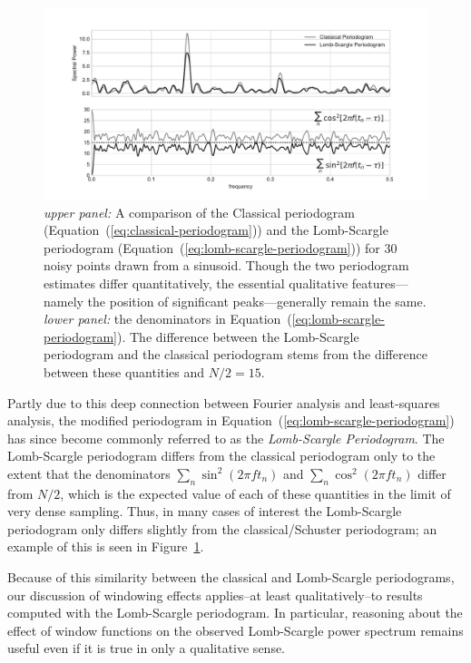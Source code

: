 \documentclass[preprint]{aastex}
\newcommand{\fig}[1]{Figure~\ref{fig:#1}}
\newcommand{\figlabel}[1]{\label{fig:#1}}
\newcommand{\Eq}[1]{Equation~(\ref{eq:#1})}
\newcommand{\eq}[1]{\Eq{#1}}
\begin{document}
\begin{figure}[ht]
  \centering
  \includegraphics[width=\textwidth]{fig17_ls_comparison}
  \caption{{\it upper panel:} A comparison of the Classical periodogram
    (\eq{classical-periodogram}) and the Lomb-Scargle periodogram
    (\eq{lomb-scargle-periodogram}) for 30 noisy points drawn from a sinusoid.
    Though the two periodogram estimates differ quantitatively, the essential
    qualitative features---namely the position of significant peaks---generally
    remain the same.
    {\it lower panel:} the denominators in \eq{lomb-scargle-periodogram}.
    The difference between the Lomb-Scargle periodogram and the classical
    periodogram stems from the difference between these quantities
    and $N/2 = 15$.
    \figlabel{ls-comparison}}
\end{figure}

Partly due to this deep connection between Fourier analysis and least-squares
analysis, the modified periodogram in \eq{lomb-scargle-periodogram}
has since become commonly referred to as the {\it Lomb-Scargle Periodogram}.
The Lomb-Scargle periodogram differs from the classical periodogram only to
the extent that the denominators $\sum_n \sin^2(2\pi f t_n)$ and
$\sum_n \cos^2(2\pi f t_n)$ differ from $N/2$, which is the expected value of
each of these quantities in the limit of very dense sampling.
Thus, in many cases of interest the Lomb-Scargle periodogram only differs
slightly from the classical/Schuster periodogram; an example of this is seen
in \fig{ls-comparison}.

Because of this similarity between the classical and Lomb-Scargle periodograms,
our discussion of windowing effects applies--at least qualitatively--to results
computed with the Lomb-Scargle periodogram.
In particular, reasoning about the effect of window functions on the observed
Lomb-Scargle power spectrum remains useful even if it is true in only a
qualitative sense.
\end{document}
